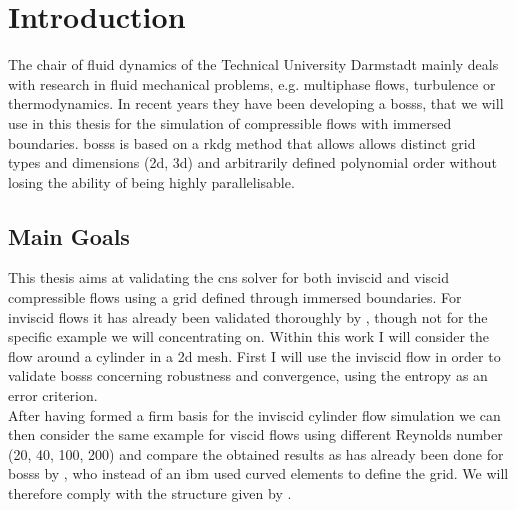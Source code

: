 \chapter{Introduction}
The chair of fluid dynamics of the Technical University Darmstadt mainly deals with research in fluid mechanical problems, e.g. multiphase flows, turbulence or thermodynamics. In recent years they have been developing a \gls{bosss}, that we will use in this thesis for the simulation of compressible flows with immersed boundaries. \gls{bosss} is based on a \gls{rkdg} method that allows allows distinct grid types and dimensions (\gls{2d}, \gls{3d}) and arbitrarily defined polynomial order without losing the ability of being highly parallelisable. 

\section{Main Goals}

This thesis aims at validating the \gls{cns} solver for both inviscid and viscid compressible flows using a grid defined through immersed boundaries. For inviscid flows it has already been validated thoroughly by \cite{mueller2014}, though not for the specific example we will concentrating on. 
Within this work I will consider the flow around a cylinder in a \gls{2d} mesh. First I will use the inviscid flow in order to validate \gls{bosss} concerning robustness and convergence, using the entropy as an error criterion. \\ \indent
After having formed a firm basis for the inviscid cylinder flow simulation we can then consider the same example for viscid flows using different Reynolds number (20, 40, 100, 200) and compare the obtained results as has already been done for \gls{bosss} by \cite{ayers}, who instead of an \gls{ibm} used curved elements to define the grid. We will therefore comply with the structure given by \cite{ayers}.


